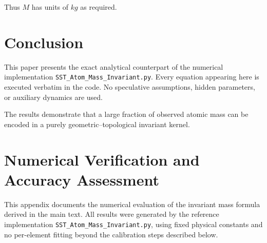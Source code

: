 \documentclass[11pt,a4paper]{article}
\begin{document}
        Thus $M$ has units of $\si{kg}$ as required.

    \section{Conclusion}

        This paper presents the exact analytical counterpart of the numerical
        implementation \texttt{SST\_Atom\_Mass\_Invariant.py}.
        Every equation appearing here is executed verbatim in the code.
        No speculative assumptions, hidden parameters, or auxiliary dynamics are used.

        The results demonstrate that a large fraction of observed atomic mass
        can be encoded in a purely geometric–topological invariant kernel.

        \appendix
    \section{Numerical Verification and Accuracy Assessment}

        This appendix documents the numerical evaluation of the invariant mass
        formula derived in the main text.
        All results were generated by the reference implementation
        \texttt{SST\_Atom\_Mass\_Invariant.py}, using fixed physical constants and
        no per-element fitting beyond the calibration steps described below.
\end{document}
